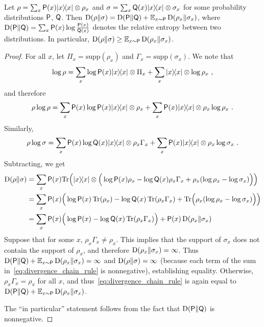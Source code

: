 \begin{proposition}
\label{prop:divergence_chain_rule}
	Let $\rho = \sum_x \P(x) \ketbra{x}{x} \otimes \rho_x$ and $\sigma = \sum_x \Qsf(x) \ketbra{x}{x} \otimes \sigma_x$ for some probability distributions $\P$, $\Qsf$. Then $\D(\rho \| \sigma) = \D(\P \| \Qsf) + \Ex_{x \sim \P} \D(\rho_x \| \sigma_x) $, where $\D(\P \| \Qsf) = \sum_x \P(x) \log \frac{\P(x)}{\Qsf(x)}$ denotes the relative entropy between two distributions. In particular, $\D(\rho \| \sigma) \geq \Ex_{x \sim \P} \D(\rho_x \| \sigma_x)$.
\end{proposition}

\begin{proof}
	For all $x$, let $\Pi_x = \mathrm{supp}(\rho_x)$ and $\Gamma_x = \mathrm{supp}(\sigma_x)$. We note that 
	\[
	\log \rho = \sum_x \log \P(x) \ketbra{x}{x} \otimes \Pi_x + \sum_x \ketbra{x}{x} \otimes \log \rho_x~,
	\]
	 and therefore 
	 \[
	 	\rho \log \rho = \sum_x \P(x) \log \P(x) \ketbra{x}{x} \otimes \rho_x + \sum_x \P(x) \ketbra{x}{x} \otimes \rho_x \log \rho_x~.
	\]
	Similarly, 
	\[
		\rho \log \sigma = \sum_x \P(x) \log \Qsf(x) \ketbra{x}{x} \otimes \rho_x \Gamma_x + \sum_x \P(x) \ketbra{x}{x} \otimes \rho_x \log \sigma_x~.
	\] 
	Subtracting, we get
	\begin{align}
		\D(\rho \| \sigma) &= \sum_x \P(x) \Tr \Big( \ketbra{x}{x} \otimes \Big( \log \P(x) \rho_x - \log \Qsf(x) \rho_x \Gamma_x + \rho_x (\log \rho_x - \log \sigma_x) \Big)  \Big ) \notag \\
		&= \sum_x \P(x) \Big( \log \P(x) \, \Tr(\rho_x) - \log \Qsf(x) \, \Tr( \rho_x \Gamma_x ) +  \Tr \Big( \rho_x (\log \rho_x - \log \sigma_x) \Big) \Big) \notag \\
		&= \sum_x \P(x) \Big( \log \P(x)  - \log \Qsf(x) \, \Tr( \rho_x \Gamma_x ) \Big) + \P(x) \, \D(\rho_x \| \sigma_x) \label{eq:divergence_chain_rule}
	\end{align}
	Suppose that for some $x$, $\rho_x \Gamma_x \neq \rho_x$. This implies that the support of $\sigma_x$ does not contain the support of $\rho_x$, and therefore $\D(\rho_x \| \sigma_x) = \infty$. Thus $\D(\P \| \Qsf) + \Ex_{x \sim \P} \D(\rho_x \| \sigma_x) = \infty$ and $\D(\rho \| \sigma) = \infty$ (because each term of the sum in~\eqref{eq:divergence_chain_rule} is nonnegative), establishing equality. Otherwise, $\rho_x \Gamma_x = \rho_x$ for all $x$, and thus~\eqref{eq:divergence_chain_rule} is again equal to $\D(\P \| \Qsf) + \Ex_{x \sim \P} \D(\rho_x \| \sigma_x)$. 
	
	The ``in particular'' statement follows from the fact that $\D(\P \| \Qsf)$ is nonnegative. 
\end{proof}

